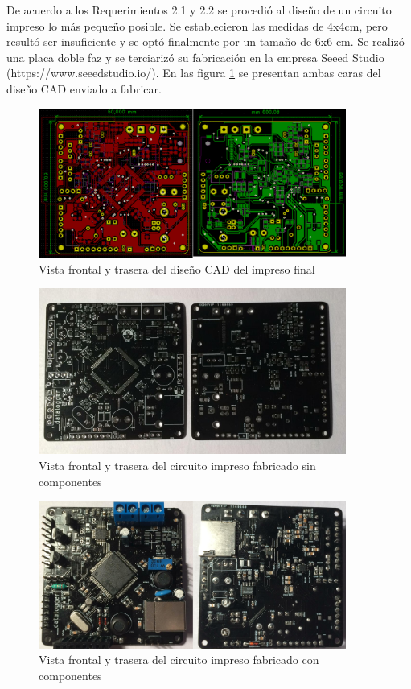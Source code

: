 De acuerdo a los Requerimientos 2.1 y 2.2 se procedió al diseño de un circuito impreso lo más pequeño posible. Se establecieron las medidas de 4x4cm, pero resultó ser insuficiente y se optó finalmente por un tamaño de 6x6 cm. Se realizó una placa doble faz y se terciarizó su fabricación en la empresa Seeed Studio (https://www.seeedstudio.io/). En las figura \ref{fig:cadFinal} se presentan ambas caras del diseño CAD enviado a fabricar.

\begin{figure}[!htbp]
	\centering	
	\includegraphics[width=0.9\textwidth]{./Figures/pcbFinal.png}			
	\caption{Vista frontal y trasera del diseño CAD del impreso final}
	\label{fig:cadFinal}
\end{figure}

\begin{figure}[!htbp]
	\centering	
	\includegraphics[width=0.9\textwidth]{./Figures/pcbFinalSinComponentes.jpeg}			
	\caption{Vista frontal y trasera del circuito impreso fabricado sin componentes}
	\label{fig:pcbFinalSinComponentes}
\end{figure}

\begin{figure}[!htbp]
	\centering	
	\includegraphics[width=0.9\textwidth]{./Figures/pcbFinalSoldado.png}			
	\caption{Vista frontal y trasera del circuito impreso fabricado con componentes}
	\label{fig:pcbFinalSoldado}
\end{figure}
